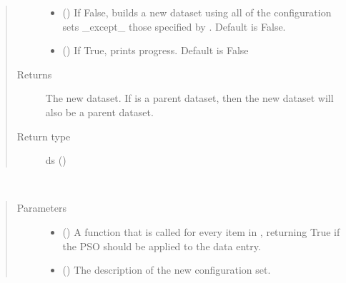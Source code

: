 \documentclass[letterpaper,10pt,english]{sphinxmanual}
\begin{document}
\begin{fulllineitems}
\begin{fulllineitems}
\begin{quote}
\begin{description}
\begin{itemize}
\item {} 
\sphinxAtStartPar
{} () \textendash{} If False, builds a new dataset using all of the configuration
sets \_except\_ those specified by . Default is False.

\item {} 
\sphinxAtStartPar
{} () \textendash{} If True, prints progress. Default is False

\end{itemize}

\item[{Returns}] \leavevmode
\sphinxAtStartPar
The new dataset. If  is a parent dataset, then the new
dataset will also be a parent dataset.

\item[{Return type}] \leavevmode
\sphinxAtStartPar
ds ({\hyperref[\detokenize{dataset:colabfit.tools.dataset.Dataset}]{}})

\end{description}\end{quote}

\end{fulllineitems}


\begin{fulllineitems}
\label{\detokenize{dataset:colabfit.tools.dataset.Dataset.define_configuration_set}}~\begin{quote}\begin{description}
\item[{Parameters}] \leavevmode\begin{itemize}
\item {} 
\sphinxAtStartPar
{} () \textendash{} A function that is called for every item in
, returning True if the PSO should be
applied to the data entry.

\item {} 
\sphinxAtStartPar
{} () \textendash{} The description of the new configuration set.


\end{itemize}
\end{description}
\end{quote}
\end{fulllineitems}
\end{fulllineitems}
\end{document}
